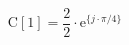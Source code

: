 \begin{center}
\[
\textrm{C}[1] = \frac{2}{2} \cdot \textrm{e}^{\{ j \cdot \pi/4 \}}
\]
\end{center}
